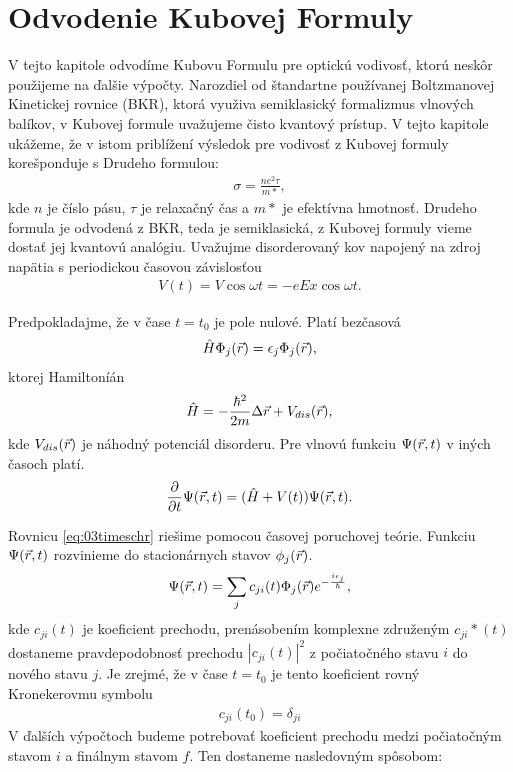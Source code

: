 \section{Odvodenie Kubovej Formuly}
V tejto kapitole odvodíme Kubovu Formulu pre optickú vodivosť, ktorú neskôr použijeme na ďalšie výpočty.
Narozdiel od štandartne používanej Boltzmanovej Kinetickej rovnice (BKR), ktorá využiva semiklasický 
formalizmus vlnových balíkov, v Kubovej formule uvažujeme čisto kvantový prístup. V tejto kapitole 
ukážeme, že v istom priblížení výsledok pre vodivosť z Kubovej formuly korešponduje s Drudeho formulou:
\begin{align}
\label{eq:03drude}
\sigma=\frac{ne^2\tau}{m*}\mathrm{,}
\end{align}
kde $n$ je číslo pásu, $\tau$ je relaxačný čas a $m*$ je efektívna hmotnosť. Drudeho formula je odvodená z 
BKR, teda je semiklasická, z Kubovej formuly vieme dostať jej kvantovú analógiu.
Uvažujme disorderovaný kov napojený na zdroj napätia s periodickou časovou závislosťou
\begin{align}
\label{eq:03potential}
V(t)=V\cos \omega t = -eEx \cos \omega t \mathrm{.}
\end{align}

Predpokladajme, že v čase $t=t_0$ je pole nulové. Platí bezčasová \schr
\begin{align}
\label{eq:03schr}
\hat{H} \Phi_j(\vec{r})= \epsilon_j\Phi_j(\vec{r}) \mathrm{,}
\end{align}
ktorej Hamiltoníán
\begin{align}
\label{eq:03Hamiltonian}
\hat{H}= - \frac{\hbar^2}{2m}\Delta \vec{r} + V_{dis}(\vec{r}) \mathrm{,} 
\end{align}
kde $V_{dis}(\vec{r})$ je náhodný potenciál disorderu. Pre vlnovú funkciu $\Psi(\vec{r},t)$ v iných časoch platí. 
\begin{align}
\label{eq:03timeschr}
\frac{\partial}{\partial t} \Psi(\vec{r},t) = (\hat{H} + V(t))\Psi(\vec{r},t)\mathrm{.}
\end{align}

Rovnicu \eqref{eq:03timeschr}  riešime pomocou časovej poruchovej teórie. Funkciu $\Psi(\vec{r},t)$ rozvinieme do stacionárnych stavov $\phi_j(\vec{r})$. 
\begin{align}
\label{eq:03stac}
\Psi(\vec{r},t)=\sum_j c_{ji}(t)\Phi_j(\vec{r})e^{-\frac{i\epsilon_j}{\hbar}} \mathrm{,}
\end{align}
kde $c_{ji}(t)$ je koeficient prechodu, prenásobením komplexne združeným   $c_{ji}*(t)$ dostaneme pravdepodobnosť prechodu $|c_{ji}(t)|^2$ z počiatočného stavu $i$ do nového stavu $j$. Je zrejmé, že v čase $t=t_0$ je tento koeficient rovný Kronekerovmu symbolu
\begin{align}
\label{eq:03cji0}
c_{ji}(t_0)=\delta_{ji}
\end{align}  
V ďalších výpočtoch budeme potrebovať koeficient prechodu medzi počiatočným stavom $i$  a finálnym stavom $f$. Ten dostaneme nasledovným spôsobom:

